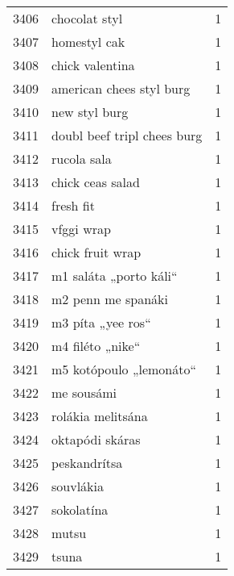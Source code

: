 \begin{tabular}{llr}
3406 &                                      chocolat styl &      1 \\
3407 &                                       homestyl cak &      1 \\
3408 &                                    chick valentina &      1 \\
3409 &                           american chees styl burg &      1 \\
3410 &                                      new styl burg &      1 \\
3411 &                        doubl beef tripl chees burg &      1 \\
3412 &                                        rucola sala &      1 \\
3413 &                                   chick ceas salad &      1 \\
3414 &                                          fresh fit &      1 \\
3415 &                                         vfggi wrap &      1 \\
3416 &                                   chick fruit wrap &      1 \\
3417 &                             m1 saláta „porto káli“ &      1 \\
3418 &                                 m2 penn me spanáki &      1 \\
3419 &                                  m3 píta „yee ros“ &      1 \\
3420 &                                   m4 filéto „nike“ &      1 \\
3421 &                            m5 kotópoulo „lemonáto“ &      1 \\
3422 &                                         me sousámi &      1 \\
3423 &                                  rolákia melitsána &      1 \\
3424 &                                    oktapódi skáras &      1 \\
3425 &                                       peskandrítsa &      1 \\
3426 &                                          souvlákia &      1 \\
3427 &                                         sokolatína &      1 \\
3428 &                                              mutsu &      1 \\
3429 &                                              tsuna &      1 \\

\end{tabular}
